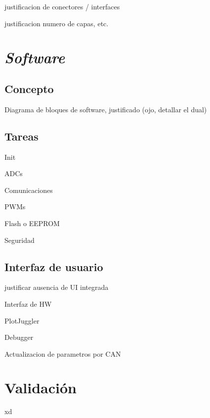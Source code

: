 justificacion de conectores / interfaces

justificacion numero de capas, etc.


\section{\textit{Software}}

\subsection{Concepto}

Diagrama de bloques de software, justificado (ojo, detallar el dual)


\subsection{Tareas}

Init

ADCs

Comunicaciones

PWMs

Flash o EEPROM

Seguridad

\subsection{Interfaz de usuario}

justificar ausencia de UI integrada

Interfaz de HW 

PlotJuggler

Debugger

Actualizacion de parametros por CAN

\section{Validación}
xd

